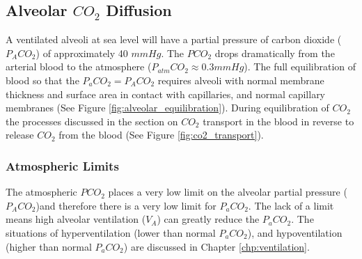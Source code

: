 
\subsection{Alveolar $CO_2$ Diffusion}

A ventilated alveoli at sea level will have a partial pressure of carbon dioxide ($P_ACO_2$) of approximately 40 $mmHg$. The $PCO_2$ drops dramatically from the arterial blood to the atmosphere ($P_{atm}CO_2 \approx 0.3 mmHg$). The full equilibration of blood so that the $P_aCO_2 = P_ACO_2$ requires alveoli with normal membrane thickness and surface area in contact with capillaries, and normal capillary membranes (See Figure \ref{fig:alveolar_equilibration}). During equilibration of $CO_2$ the processes discussed in the section on $CO_2$ transport in the blood in reverse to release $CO_2$ from the blood (See Figure \ref{fig:co2_transport}). 

\subsubsection{Atmospheric Limits}

The atmospheric $PCO_2$ places a very low limit on the alveolar partial pressure ($P_ACO_2$)and therefore there is a very low limit for $P_aCO_2$. The lack of a limit means high alveolar ventilation ($V_A$) can greatly reduce the $P_aCO_2$. The situations of hyperventilation (lower than normal $P_aCO_2$), and hypoventilation (higher than normal $P_aCO_2$) are discussed in Chapter \ref{chp:ventilation}. 

